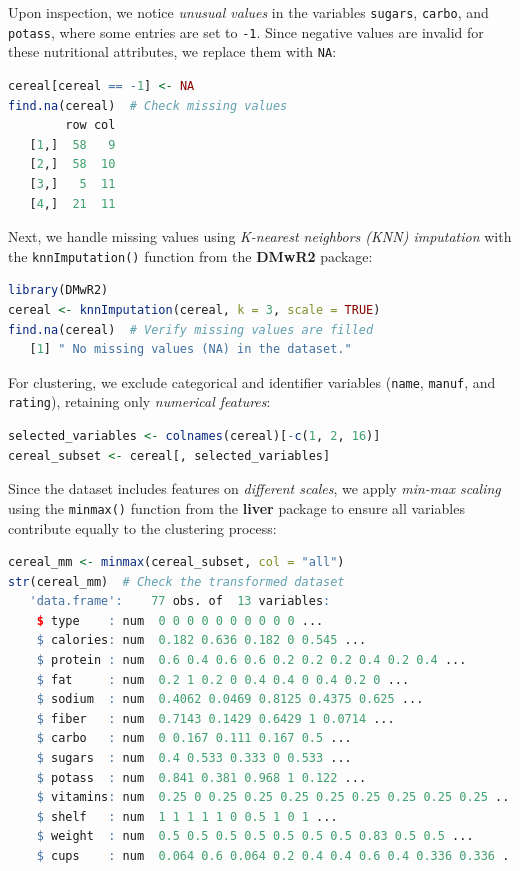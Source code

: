 \documentclass[
]{book}
\newcommand{\passthrough}[1]{#1}
\theoremstyle{definition}
\theoremstyle{definition}
\theoremstyle{definition}
\theoremstyle{definition}
\theoremstyle{remark}
\begin{document}
Upon inspection, we notice \emph{unusual values} in the variables \passthrough{\lstinline!sugars!}, \passthrough{\lstinline!carbo!}, and \passthrough{\lstinline!potass!}, where some entries are set to \passthrough{\lstinline!-1!}. Since negative values are invalid for these nutritional attributes, we replace them with \passthrough{\lstinline!NA!}:

\begin{lstlisting}[language=R]
cereal[cereal == -1] <- NA
find.na(cereal)  # Check missing values
        row col
   [1,]  58   9
   [2,]  58  10
   [3,]   5  11
   [4,]  21  11
\end{lstlisting}

Next, we handle missing values using \emph{K-nearest neighbors (KNN) imputation} with the \passthrough{\lstinline!knnImputation()!} function from the \textbf{DMwR2} package:

\begin{lstlisting}[language=R]
library(DMwR2)
cereal <- knnImputation(cereal, k = 3, scale = TRUE)
find.na(cereal)  # Verify missing values are filled
   [1] " No missing values (NA) in the dataset."
\end{lstlisting}

For clustering, we exclude categorical and identifier variables (\passthrough{\lstinline!name!}, \passthrough{\lstinline!manuf!}, and \passthrough{\lstinline!rating!}), retaining only \emph{numerical features}:

\begin{lstlisting}[language=R]
selected_variables <- colnames(cereal)[-c(1, 2, 16)]
cereal_subset <- cereal[, selected_variables]
\end{lstlisting}

Since the dataset includes features on \emph{different scales}, we apply \emph{min-max scaling} using the \passthrough{\lstinline!minmax()!} function from the \textbf{liver} package to ensure all variables contribute equally to the clustering process:

\begin{lstlisting}[language=R]
cereal_mm <- minmax(cereal_subset, col = "all")
str(cereal_mm)  # Check the transformed dataset
   'data.frame':    77 obs. of  13 variables:
    $ type    : num  0 0 0 0 0 0 0 0 0 0 ...
    $ calories: num  0.182 0.636 0.182 0 0.545 ...
    $ protein : num  0.6 0.4 0.6 0.6 0.2 0.2 0.2 0.4 0.2 0.4 ...
    $ fat     : num  0.2 1 0.2 0 0.4 0.4 0 0.4 0.2 0 ...
    $ sodium  : num  0.4062 0.0469 0.8125 0.4375 0.625 ...
    $ fiber   : num  0.7143 0.1429 0.6429 1 0.0714 ...
    $ carbo   : num  0 0.167 0.111 0.167 0.5 ...
    $ sugars  : num  0.4 0.533 0.333 0 0.533 ...
    $ potass  : num  0.841 0.381 0.968 1 0.122 ...
    $ vitamins: num  0.25 0 0.25 0.25 0.25 0.25 0.25 0.25 0.25 0.25 ...
    $ shelf   : num  1 1 1 1 1 0 0.5 1 0 1 ...
    $ weight  : num  0.5 0.5 0.5 0.5 0.5 0.5 0.5 0.83 0.5 0.5 ...
    $ cups    : num  0.064 0.6 0.064 0.2 0.4 0.4 0.6 0.4 0.336 0.336 ...
\end{lstlisting}
\end{document}
